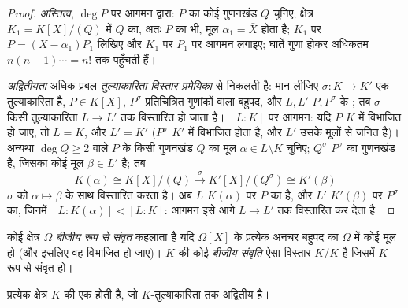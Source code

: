 \begin{proof}
\emph{अस्तित्व}, $\deg P$ पर आगमन द्वारा: $P$ का कोई 
गुणनखंड $Q$ चुनिए; क्षेत्र $K_1 = K[X]/(Q)$ में $Q$ का, अतः $P$ का
भी, मूल $\alpha_1 = \bar X$ होता है; $K_1$ पर $P = (X -
\alpha_1)P_1$ लिखिए और $K_1$ पर $P_1$
पर आगमन लगाइए; घातें गुणा होकर अधिकतम $n(n-1)\cdots = n!$ तक पहुँचती हैं।

\emph{अद्वितीयता} अधिक प्रबल \emph{तुल्याकारिता विस्तार
प्रमेयिका} से निकलती है: मान लीजिए $\sigma \colon K \to K'$ एक तुल्याकारिता है,
$P \in K[X]$, $P^\sigma$ प्रतिचित्रित गुणांकों वाला बहुपद, और $L, L'$ $P, P^\sigma$
के ; तब $\sigma$ किसी तुल्याकारिता $L \to L'$ तक विस्तारित
हो जाता है। $[L:K]$ पर आगमन: यदि $P$ $K$ में विभाजित हो जाए,
तो $L = K$, और $L' = K'$ ($P^\sigma$ $K'$ में विभाजित होता है, और $L'$
उसके मूलों से जनित है)। अन्यथा $\deg Q \geq 2$ वाले $P$ के किसी 
गुणनखंड $Q$ का मूल $\alpha \in L \setminus K$ चुनिए; $Q^\sigma$ $P^\sigma$ का 
गुणनखंड है, जिसका कोई मूल $\beta \in L'$ है; तब
\[
K(\alpha) \cong K[X]/(Q) \xrightarrow{\ \sigma\ }
K'[X]/(Q^\sigma) \cong K'(\beta)
\]
$\sigma$ को $\alpha \mapsto \beta$ के साथ विस्तारित करता है। अब $L$ $K(\alpha)$ पर
$P$ का  है, और $L'$ $K'(\beta)$ पर $P^\sigma$ का, जिनमें
$[L : K(\alpha)] < [L:K]$: आगमन इसे आगे $L \to L'$ तक विस्तारित कर देता है।
\end{proof}

\begin{definition}\label{def:b3:galois:closure}
कोई क्षेत्र $\Omega$ \emph{बीजीय रूप से संवृत} कहलाता है यदि $\Omega[X]$ के प्रत्येक अनचर बहुपद का
$\Omega$ में कोई मूल हो (और इसलिए वह विभाजित हो जाए)। $K$ की कोई
\emph{बीजीय संवृति} ऐसा  विस्तार $\bar K/K$
है जिसमें $\bar K$  रूप से संवृत हो।
\end{definition}

\begin{theorem}[श्टाइनित्स]\label{thm:b3:galois:steinitz}
प्रत्येक क्षेत्र $K$ की एक  होती है, जो
$K$-तुल्याकारिता तक अद्वितीय है।
\end{theorem}

